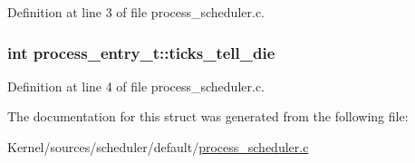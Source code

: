 Definition at line 3 of file process\_\-scheduler.c.

\hypertarget{structprocess__entry__t_a4f8e8fb3d475e2c7583490cd962fcff5}{
\subsubsection[{ticks\_\-tell\_\-die}]{\setlength{\rightskip}{0pt plus 5cm}int {\bf process\_\-entry\_\-t::ticks\_\-tell\_\-die}}}
\label{structprocess__entry__t_a4f8e8fb3d475e2c7583490cd962fcff5}


Definition at line 4 of file process\_\-scheduler.c.



The documentation for this struct was generated from the following file:\begin{DoxyCompactItemize}
\item 
Kernel/sources/scheduler/default/\hyperlink{process__scheduler_8c}{process\_\-scheduler.c}\end{DoxyCompactItemize}

